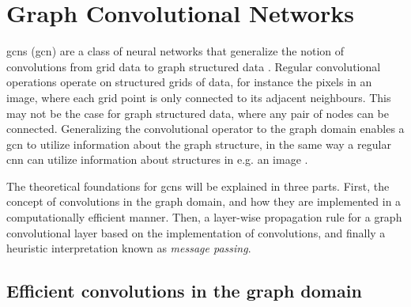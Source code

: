 \section{Graph Convolutional Networks}
\label{sec:gcn}

\acrlong{gcn}s (\acrshort{gcn}) are a class of neural networks that generalize the notion of convolutions from grid data to graph structured data \cite{wu_review}. Regular convolutional operations operate on structured grids of data, for instance the pixels in an image, where each grid point is only connected to its adjacent neighbours. This may not be the case for graph structured data, where any pair of nodes can be connected. Generalizing the convolutional operator to the graph domain enables a \acrshort{gcn} to utilize information about the graph structure, in the same way a regular \acrshort{cnn} can utilize information about structures in e.g. an image \cite{wu_review}.

The theoretical foundations for \acrshort{gcn}s will be explained in three parts. First, the concept of convolutions in the graph domain, and how they are implemented in a computationally efficient manner. Then, a layer-wise propagation rule for a graph convolutional layer based on the implementation of convolutions, and finally a heuristic interpretation known as \textit{message passing}.

\subsection{Efficient convolutions in the graph domain}

